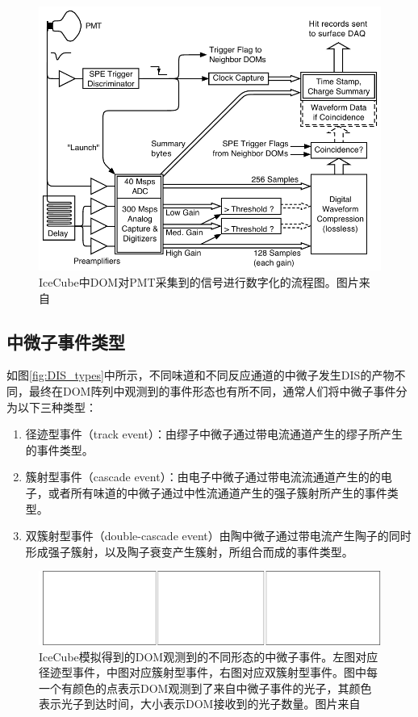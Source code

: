 \begin{figure}[htb]
    \centering
    \includegraphics[width=0.8\linewidth]{img/IC_DOM_data_flow.pdf}
    \caption{IceCube中DOM对PMT采集到的信号进行数字化的流程图。图片来自\parencite{IceCube_detector:2016}}
    \label{fig:IC_DOM_data_flow}
\end{figure}

\subsection{中微子事件类型}

如图\ref{fig:DIS_types}中所示，不同味道和不同反应通道的中微子发生DIS的产物不同，最终在DOM阵列中观测到的事件形态也有所不同，通常人们将中微子事件分为以下三种类型：
\begin{enumerate}
    \item 径迹型事件（track event）：由缪子中微子通过带电流通道产生的缪子所产生的事件类型。
    \item 簇射型事件（cascade event）：由电子中微子通过带电流流通道产生的的电子，或者所有味道的中微子通过中性流通道产生的强子簇射所产生的事件类型。
    \item 双簇射型事件（double-cascade event）由陶中微子通过带电流产生陶子的同时形成强子簇射，以及陶子衰变产生簇射，所组合而成的事件类型。
\end{enumerate}

\begin{figure}[htb]
    \centering
    \includegraphics[width=0.98\linewidth]{img/event_topologies.pdf}
    \caption{IceCube模拟得到的DOM观测到的不同形态的中微子事件。左图对应径迹型事件，中图对应簇射型事件，右图对应双簇射型事件。图中每一个有颜色的点表示DOM观测到了来自中微子事件的光子，其颜色表示光子到达时间，大小表示DOM接收到的光子数量。图片来自\parencite{IceCube-Gen2_white_paper:2020}}
    \label{fig:event_topologies}
\end{figure}


